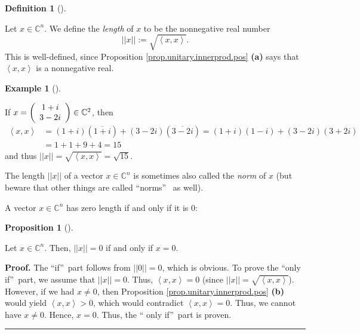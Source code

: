 \documentclass[numbers=enddot,12pt,final,onecolumn,notitlepage]{scrartcl}%
\numberwithin{exer}{subsection}
\theoremstyle{definition}
\newtheorem{prop}[theo]{Proposition}
\newenvironment{proposition}[1][]
{\begin{prop}[#1]\begin{leftbar}}
{\end{leftbar}\end{prop}}
\newtheorem{defi}[theo]{Definition}
\newenvironment{definition}[1][]
{\begin{defi}[#1]\begin{leftbar}}
{\end{leftbar}\end{defi}}
\newtheorem{exam}[theo]{Example}
\newenvironment{example}[1][]
{\begin{exam}[#1]\begin{leftbar}}
{\end{leftbar}\end{exam}}
\newenvironment{proof}[1][Proof]{\noindent\textbf{#1.} }{\ \rule{0.5em}{0.5em}}
\begin{document}
\begin{definition}
\label{def.unitary.innerprod.len}Let $x\in\mathbb{C}^{n}$. We define the
\emph{length} of $x$ to be the nonnegative real number
\[
\left\vert \left\vert x\right\vert \right\vert :=\sqrt{\left\langle
x,x\right\rangle }.
\]
This is well-defined, since Proposition \ref{prop.unitary.innerprod.pos}
\textbf{(a)} says that $\left\langle x,x\right\rangle $ is a nonnegative real.
\end{definition}

\begin{example}
If $x=\left(
\begin{array}
[c]{c}%
1+i\\
3-2i
\end{array}
\right)  \in\mathbb{C}^{2}$, then%
\begin{align*}
\left\langle x,x\right\rangle  &  =\left(  1+i\right)  \left(  \overline
{1+i}\right)  +\left(  3-2i\right)  \left(  \overline{3-2i}\right)  =\left(
1+i\right)  \left(  1-i\right)  +\left(  3-2i\right)  \left(  3+2i\right) \\
&  =1+1+9+4=15
\end{align*}
and thus $\left\vert \left\vert x\right\vert \right\vert =\sqrt{\left\langle
x,x\right\rangle }=\sqrt{15}$.
\end{example}

The length $\left\vert \left\vert x\right\vert \right\vert $ of a vector
$x\in\mathbb{C}^{n}$ is sometimes also called the \emph{norm} of $x$ (but
beware that other things are called \textquotedblleft norms\textquotedblright%
\ as well).

A vector $x\in\mathbb{C}^{n}$ has zero length if and only if it is $0$:

\begin{proposition}
Let $x\in\mathbb{C}^{n}$. Then, $\left\vert \left\vert x\right\vert
\right\vert =0$ if and only if $x=0$.
\end{proposition}

\begin{proof}
The \textquotedblleft if\textquotedblright\ part follows from $\left\vert
\left\vert 0\right\vert \right\vert =0$, which is obvious. To prove the
\textquotedblleft only if\textquotedblright\ part, we assume that $\left\vert
\left\vert x\right\vert \right\vert =0$. Thus, $\left\langle x,x\right\rangle
=0$ (since $\left\vert \left\vert x\right\vert \right\vert =\sqrt{\left\langle
x,x\right\rangle }$). However, if we had $x\neq0$, then Proposition
\ref{prop.unitary.innerprod.pos} \textbf{(b)} would yield $\left\langle
x,x\right\rangle >0$, which would contradict $\left\langle x,x\right\rangle
=0$. Thus, we cannot have $x\neq0$. Hence, $x=0$. Thus, the \textquotedblleft
only if\textquotedblright\ part is proven.
\end{proof}
\end{document}
